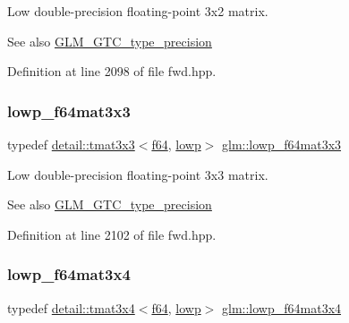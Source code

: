 Low double-\/precision floating-\/point 3x2 matrix. \begin{DoxySeeAlso}{See also}
\hyperlink{group__gtc__type__precision}{G\+L\+M\+\_\+\+G\+T\+C\+\_\+type\+\_\+precision} 
\end{DoxySeeAlso}


Definition at line 2098 of file fwd.\+hpp.

\mbox{\label{group__gtc__type__precision_ga3b636bef3048da2f7935eae13e66f7b3}} 
\subsubsection{\texorpdfstring{lowp\+\_\+f64mat3x3}{lowp\_f64mat3x3}}
{\footnotesize\ttfamily typedef \hyperlink{structglm_1_1detail_1_1tmat3x3}{detail\+::tmat3x3}$<$\hyperlink{group__gtc__type__precision_ga2bba392e555124b36cde6abba349bab3}{f64}, \hyperlink{namespaceglm_a0f04f086094c747d227af4425893f545ae161af3fc695e696ce3bf69f7332bc2d}{lowp}$>$ \hyperlink{group__gtc__type__precision_ga3b636bef3048da2f7935eae13e66f7b3}{glm\+::lowp\+\_\+f64mat3x3}}

Low double-\/precision floating-\/point 3x3 matrix. \begin{DoxySeeAlso}{See also}
\hyperlink{group__gtc__type__precision}{G\+L\+M\+\_\+\+G\+T\+C\+\_\+type\+\_\+precision} 
\end{DoxySeeAlso}


Definition at line 2102 of file fwd.\+hpp.

\mbox{\label{group__gtc__type__precision_ga988c6645dead17a842c47ec042b5369e}} 
\subsubsection{\texorpdfstring{lowp\+\_\+f64mat3x4}{lowp\_f64mat3x4}}
{\footnotesize\ttfamily typedef \hyperlink{structglm_1_1detail_1_1tmat3x4}{detail\+::tmat3x4}$<$\hyperlink{group__gtc__type__precision_ga2bba392e555124b36cde6abba349bab3}{f64}, \hyperlink{namespaceglm_a0f04f086094c747d227af4425893f545ae161af3fc695e696ce3bf69f7332bc2d}{lowp}$>$ \hyperlink{group__gtc__type__precision_ga988c6645dead17a842c47ec042b5369e}{glm\+::lowp\+\_\+f64mat3x4}}

